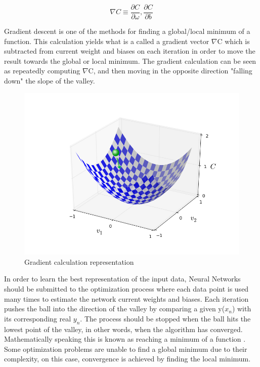 $$\nabla C \equiv \frac{\partial C}{\partial \omega}, \frac{\partial C}{\partial b}$$

Gradient descent is one of the methods for finding a global/local minimum of a function. This calculation yields what is a called a gradient vector $\nabla$C which is subtracted from current weight and biases on each iteration in order to move the result towards the global or local minimum. The gradient calculation can be seen as repeatedly computing $\nabla$C, and then moving in the opposite direction "falling down" the slope of the valley.

\begin{figure}[!ht]
	\centering
	\includegraphics[scale=0.3]{valley_with_ball.png}
	\caption{Gradient calculation representation \cite{nielsen2016}}
	\label{fig:net_change}
\end{figure}

In order to learn the best representation of the input data, Neural Networks should be submitted to the optimization process where each data point is used many times to estimate the network current weights and biases. Each iteration pushes the ball into the direction of the valley by comparing a given y($x_n$) with its corresponding real $y_n$. The process should be stopped when the ball hits the lowest point of the valley, in other words, when the algorithm has converged. Mathematically speaking this is known as reaching a minimum of a function \cite{nielsen2016}. Some optimization problems are unable to find a global minimum due to their complexity, on this case, convergence is achieved by finding the local minimum.

